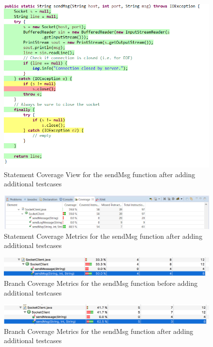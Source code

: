 \documentclass[fontsize=12pt,paper=letter,twoside]{scrartcl}
\begin{document}
\begin{figure}[!htb]
\begin{center}
\includegraphics[width=.99\textwidth]{images/wbt/bvt/figure3.png}
\end{center}
\caption{Statement Coverage View for the sendMsg function after adding additional testcases}
\label{fig:wbt_bvt_code}
\end{figure}
\begin{figure}[!htb]
\begin{center}
\includegraphics[width=.99\textwidth]{images/wbt/bvt/figure4.png}
\end{center}
\caption{Statement Coverage Metrics for the sendMsg function after adding additional testcases}
\label{fig:wbt_bvt_code}
\end{figure}

\begin{figure}[!htb]
\begin{center}
\includegraphics[width=.99\textwidth]{images/wbt/bvt/figure5.png}
\end{center}
\caption{Branch Coverage Metrics for the sendMsg function before adding additional testcases}
\label{fig:wbt_bvt_code}
\end{figure}
\begin{figure}[!htb]
\begin{center}
\includegraphics[width=.99\textwidth]{images/wbt/bvt/figure6.png}
\end{center}
\caption{Branch Coverage Metrics for the sendMsg function after adding additional testcases}
\label{fig:wbt_bvt_code}
\end{figure}
\end{document}
